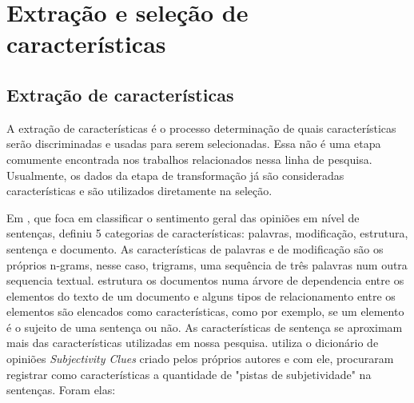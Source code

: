 \documentclass[template.tex]{subfiles}
\begin{document}

\section{Extração e seleção de características}

%
%
%
%
%

\subsection{Extração de características}

A extração de características é o processo determinação de quais características serão discriminadas e usadas para serem selecionadas. Essa não é uma etapa comumente encontrada nos trabalhos relacionados nessa linha de pesquisa. Usualmente, os dados da etapa de transformação já são consideradas características e são utilizados diretamente na seleção.

Em , que foca em classificar o sentimento geral das opiniões em nível de sentenças, definiu 5 categorias de características: palavras, modificação, estrutura, sentença e documento. As características de palavras e de modificação são os próprios n-grams, nesse caso, trigrams, uma sequência de três palavras num outra sequencia textual.  estrutura os documentos numa árvore de dependencia entre os elementos do texto de um documento e alguns tipos de relacionamento entre os elementos são elencados como características, como por exemplo, se um elemento é o sujeito de uma sentença ou não. As características de sentença se aproximam mais das características utilizadas em nossa pesquisa.  utiliza o dicionário de opiniões \textit{Subjectivity Clues} criado pelos próprios autores e com ele, procuraram registrar como características a quantidade de "pistas de subjetividade" na sentenças. Foram elas:
\end{document}

